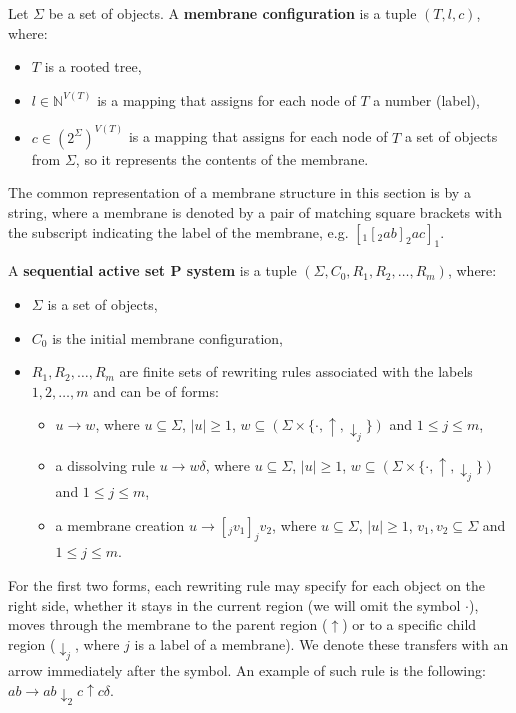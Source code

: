   Let $\Sigma$ be a set of objects. A {\bf membrane configuration} is a tuple $(T, l, c)$, where:
  \begin{itemize}
    \item $T$ is a rooted tree,
    \item $l\in\mathbb N^{V(T)}$ is a mapping that assigns for each node of $T$ a number (label),
    \item $c\in(2^\Sigma)^{V(T)}$ is a mapping that assigns for each node of $T$ a set of objects from $\Sigma$, so it represents the contents of the membrane.
  \end{itemize}

  The common representation of a membrane structure in this section is by a string, where a membrane is denoted by a pair of matching square brackets with the subscript indicating the label of the membrane, e.g. $[_1 [_2 ab ]_2 ac ]_1$.

  A {\bf sequential active set P system} is a tuple $(\Sigma, C_0, R_1, R_2, \dots , R_m)$, where:
  \begin{itemize}
    \item $\Sigma$ is a set of objects,
    \item $C_0$ is the initial membrane configuration,
    \item $R_1,R_2,\dots, R_m$ are finite sets of rewriting rules associated with the labels $1,2,\dots,m$ and can be of forms:
    \begin{itemize}
      \item $u\rightarrow w$, where $u\subseteq \Sigma$, $|u|\geq 1$, $w\subseteq (\Sigma\times\{\cdot, \uparrow, \downarrow_j\})$ and $1\leq j\leq m$,
      \item a dissolving rule $u\rightarrow w\delta$, where $u\subseteq \Sigma$, $|u|\geq 1$, $w\subseteq (\Sigma\times\{\cdot, \uparrow, \downarrow_j\})$ and $1\leq j\leq m$,
      \item a membrane creation $u\rightarrow [_j v_1]_j v_2$, where $u\subseteq \Sigma$, $|u|\geq 1$, $v_1, v_2\subseteq \Sigma$ and $1\leq j\leq m$.
    \end{itemize}
  \end{itemize}

  For the first two forms, each rewriting rule may specify for each object on the right side, whether it stays in the current region (we will omit the symbol $\cdot$), moves through the membrane to the parent region ($\uparrow$) or to a specific child region ($\downarrow_j$, where $j$ is a label of a membrane).
  We denote these transfers with an arrow immediately after the symbol.
  An example of such rule is the following: $ab\rightarrow ab\downarrow_2 c\uparrow c\delta$.

